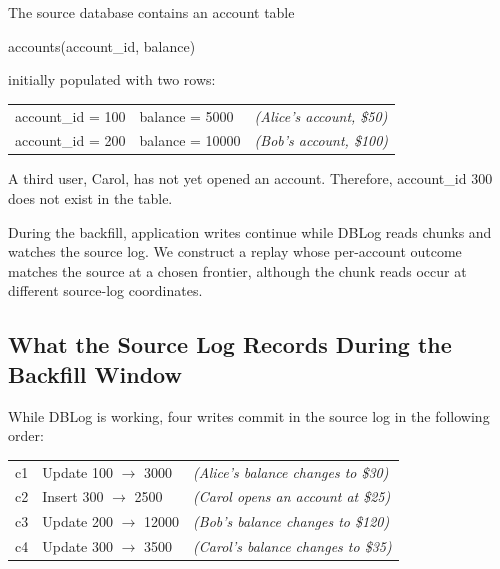 \documentclass[letterpaper,10pt,twocolumn]{article}
\begin{document}
The source database contains an account table

\begin{center}\ttfamily\small
accounts(account\_id, balance)
\end{center}

initially populated with two rows:

\begin{center}\footnotesize
\begin{tabular}{@{}l@{\hskip 1em}l@{\hskip 1em}l@{}}
\ttfamily account\_id = 100 & \ttfamily balance = \phantom{0}5000 & \itshape (Alice's account, \$50)\\
\ttfamily account\_id = 200 & \ttfamily balance = 10000           & \itshape (Bob's account, \$100)\\
\end{tabular}
\end{center}

A third user, Carol, has not yet opened an account. Therefore,
account\_id 300 does not exist in the table.

During the backfill, application writes continue while DBLog reads
chunks and watches the source log. We construct a replay whose
per-account outcome matches the source at a chosen frontier, although
the chunk reads occur at different source-log coordinates.

\subsection{What the Source Log Records During the Backfill
Window}\label{what-the-source-log-records-during-the-backfill-window}

While DBLog is working, four writes commit in the source log in
the following order:

\begin{center}\footnotesize
\begin{tabular}{@{}l@{\hskip 1em}l@{\hskip 1em}l@{}}
\ttfamily c1 & \ttfamily Update 100 $\to$ \phantom{0}3000 & \itshape (Alice's balance changes to \$30)\\
\ttfamily c2 & \ttfamily Insert 300 $\to$ \phantom{0}2500  & \itshape (Carol opens an account at \$25)\\
\ttfamily c3 & \ttfamily Update 200 $\to$ 12000           & \itshape (Bob's balance changes to \$120)\\
\ttfamily c4 & \ttfamily Update 300 $\to$ \phantom{0}3500 & \itshape (Carol's balance changes to \$35)\\
\end{tabular}
\end{center}
\end{document}
